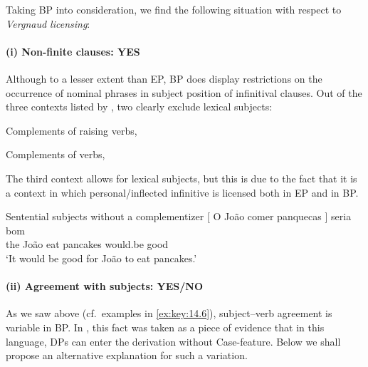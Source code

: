 \documentclass[output=paper]{langsci/langscibook}
\begin{document}
Taking \gls{BP} into consideration, we find the
following situation with respect to \emph{Vergnaud licensing}:

\paragraph*{(i) Non-finite clauses: YES}

Although to a lesser extent than \gls{EP},
\gls{BP} does display restrictions
on the occurrence of nominal phrases in subject position of infinitival
clauses. Out of the three contexts listed by \textcite{SheevanderWal2018}, two
clearly exclude lexical subjects:

\ea\label{ex:key:14.23}Complements of raising verbs, 
\z

\ea\label{ex:key:14.24}Complements of  verbs, 
\z

The third context allows for lexical subjects, but this is due to the fact that
it is a context in which personal/inflected infinitive is licensed both in
\gls{EP} and in BP.

\ea\label{ex:key:14.25}Sentential subjects without a complementizer
    \sn
    \gll    {}[ O João comer panquecas ] seria bom\\
            {} the João eat pancakes {} would.be good\\
    \glt    \enquote*{It would be good for João to eat pancakes.}
\z

\paragraph*{(ii) Agreement with subjects: YES/NO}

As we saw above (cf.\ examples in \eqref{ex:key:14.6}), subject--verb agreement is
variable in BP. In \textcite{AvelarGalves2011,AvelarGalves2016}, this fact was taken as a
piece of evidence that in this language, DPs can enter the derivation without
Case-feature. Below we shall propose an alternative explanation for such a
variation.
\end{document}
